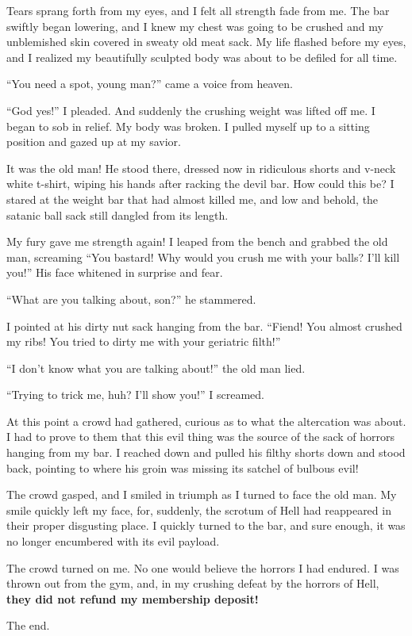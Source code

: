 Tears sprang forth from my eyes, and I felt all strength fade from
me. The bar swiftly began lowering, and I knew my chest was going
to be crushed and my unblemished skin covered in sweaty old meat
sack. My life flashed before my eyes, and I realized my beautifully
sculpted body was about to be defiled for all time.



``You need a spot, young man?'' came a voice from heaven.



``God yes!'' I pleaded. And suddenly the crushing weight was lifted
off me. I began to sob in relief. My body was broken. I pulled
myself up to a sitting position and gazed up at my savior.



It was the old man! He stood there, dressed now in ridiculous
shorts and v-neck white t-shirt, wiping his hands after racking the
devil bar. How could this be? I stared at the weight bar that had
almost killed me, and low and behold, the satanic ball sack still
dangled from its length.



My fury gave me strength again! I leaped from the bench and grabbed
the old man, screaming ``You bastard! Why would you crush me with
your balls? I'll kill you!'' His face whitened in surprise and
fear.



``What are you talking about, son?'' he stammered.



I pointed at his dirty nut sack hanging from the bar. ``Fiend! You
almost crushed my ribs! You tried to dirty me with your geriatric
filth!''



``I don't know what you are talking about!'' the old man lied.



``Trying to trick me, huh? I'll show you!'' I screamed.



At this point a crowd had gathered, curious as to what the
altercation was about. I had to prove to them that this evil thing
was the source of the sack of horrors hanging from my bar. I
reached down and pulled his filthy shorts down and stood back,
pointing to where his groin was missing its satchel of bulbous
evil!



The crowd gasped, and I smiled in triumph as I turned to face the
old man. My smile quickly left my face, for, suddenly, the scrotum
of Hell had reappeared in their proper disgusting place. I quickly
turned to the bar, and sure enough, it was no longer encumbered
with its evil payload.



The crowd turned on me. No one would believe the horrors I had
endured. I was thrown out from the gym, and, in my crushing defeat
by the horrors of Hell, {\bf they did not refund my membership
deposit!}



The end. 
 






